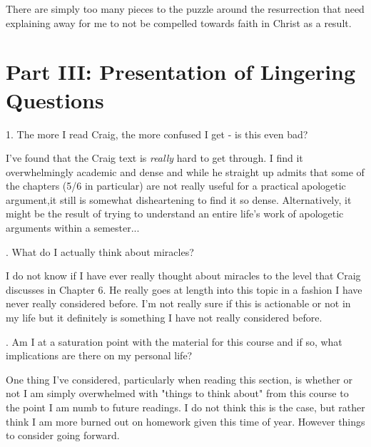 \documentclass[12pt]{turabian-researchpaper}
\begin{document}
There are simply too many pieces to the puzzle around the resurrection that need explaining away for me to not be compelled towards faith in Christ as a result.

\section{Part III: Presentation of Lingering Questions}

1. The more I read Craig, the more confused I get - is this even bad?

I've found that the Craig text is \textit{really} hard to get through. I find it overwhelmingly academic and dense and while he straight up admits that some of the chapters (5/6 in particular) are not really useful for a practical apologetic argument,it still is somewhat disheartening to find it so dense. Alternatively, it might be the result of trying to understand an entire life's work of apologetic arguments within a semester...

. What do I actually think about miracles?

I do not know if I have ever really thought about miracles to the level that Craig discusses in Chapter 6. He really goes at length into this topic in a fashion I have never really considered before. I'm not really sure if this is actionable or not in my life but it definitely is something I have not really considered before.

. Am I at a saturation point with the material for this course and if so, what implications are there on my personal life?

One thing I've considered, particularly when reading this section, is whether or not I am simply overwhelmed with "things to think about" from this course to the point I am numb to future readings. I do not think this is the case, but rather think I am more burned out on homework given this time of year. However things to consider going forward.


\newpage
\printbibliography
\end{document}
